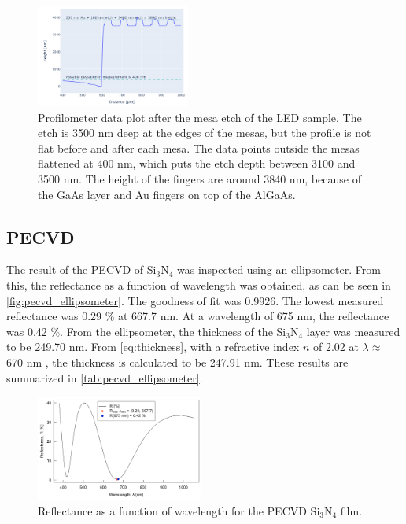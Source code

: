\begin{figure}[ht]
    \centering
    \includegraphics[width=0.45\textwidth]{figures/LED_AlGaAs_3100nm_etch.png}
    \caption{
        Profilometer data plot after the mesa etch of the LED sample.
        The etch is 3500 nm deep at the edges of the mesas, but the profile is not flat before and after each mesa. 
        The data points outside the mesas flattened at 400 nm, which puts the etch depth between 3100 and 3500 nm.
        The height of the fingers are around 3840 nm, because of the GaAs layer and Au fingers on top of the AlGaAs.
    }
    \label{fig:profilometer_AlGaAs_3500nm_etch}
\end{figure}

\subsection{PECVD}

The result of the PECVD of Si$_3$N$_4$ was inspected using an ellipsometer.
From this, the reflectance as a function of wavelength was obtained, as can be seen in \autoref{fig:pecvd_ellipsometer}.
The goodness of fit was 0.9926.
The lowest measured reflectance was 0.29 \% at 667.7 nm. 
At a wavelength of 675 nm, the reflectance was 0.42 \%.
From the ellipsometer, the thickness of the Si$_3$N$_4$ layer was measured to be 249.70 nm.
From \autoref{eq:thickness}, with a refractive index $n$ of 2.02 at $\lambda \approx$ 670 nm \cite{ref_index_Si3N4}, the thickness is calculated to be 247.91 nm. 
These results are summarized in \autoref{tab:pecvd_ellipsometer}.

\begin{figure}
    \centering
    \includegraphics[width=0.49\textwidth]{figures/PECVD_elips.png}
    \caption{Reflectance as a function of wavelength for the PECVD Si$_3$N$_4$ film.}
    \label{fig:pecvd_ellipsometer}
\end{figure}

